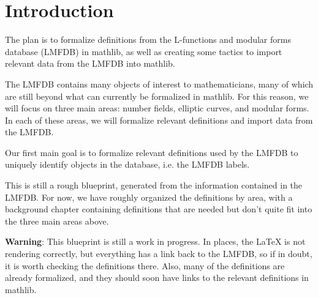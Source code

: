 %

\tableofcontents

\chapter{Introduction}

The plan is to formalize definitions from the L-functions and modular forms database (LMFDB) in mathlib, as well as creating some tactics to import relevant data from the LMFDB into mathlib.

The LMFDB contains many objects of interest to mathematicians, many of which are still beyond what can currently be formalized in mathlib. For this reason, we will focus on three main areas: number fields, elliptic curves, and modular forms. In each of these areas, we will formalize relevant definitions and import data from the LMFDB.

Our first main goal is to formalize relevant definitions used by the LMFDB to uniquely identify objects in the database, i.e. the LMFDB labels.

This is still a rough blueprint, generated from the information contained in the LMFDB. For now, we have roughly organized the definitions by area, with a background chapter containing definitions that are needed but don't quite fit into the three main areas above.

\textbf{Warning}: This blueprint is still a work in progress. In places, the LaTeX is not rendering correctly, but everything has a link back to the LMFDB, so if in doubt, it is worth checking the definitions there. Also, many of the definitions are already formalized, and they should soon have links to the relevant definitions in mathlib.






